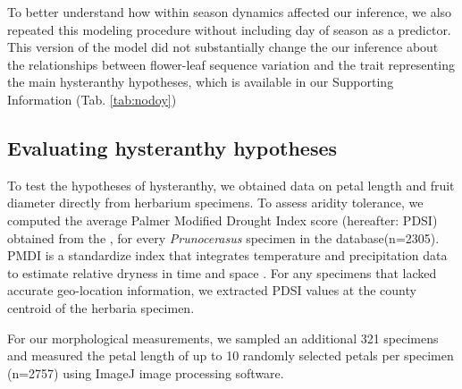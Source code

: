 \documentclass{article}[12pt]
\begin{document}
To better understand how within season dynamics affected our inference, we also repeated this modeling procedure without including day of season as a predictor. This version of the model did not substantially change the our inference about the relationships between flower-leaf sequence variation and the trait representing the main hysteranthy hypotheses, which is available in our Supporting Information (Tab. \ref{tab:nodoy})

\subsection*{Evaluating hysteranthy hypotheses}

To test the hypotheses of hysteranthy, we obtained data on petal length and fruit diameter directly from herbarium specimens. To assess aridity tolerance, we computed the average Palmer Modified Drought Index score (hereafter: PDSI) obtained from the \citet{NOAA}, for every \textit{Prunocerasus} specimen in the database(n=2305). PMDI is a standardize index that integrates temperature and precipitation data to estimate relative dryness in time and space \citep{Heim:2002uw}. For any specimens that lacked accurate geo-location information, we extracted PDSI values at the county centroid of the herbaria specimen. 

\noindent For our morphological measurements, we sampled an additional 321 specimens and measured the petal length of up to 10 randomly selected petals per specimen (n=2757) using ImageJ image processing software.%
\end{document}
